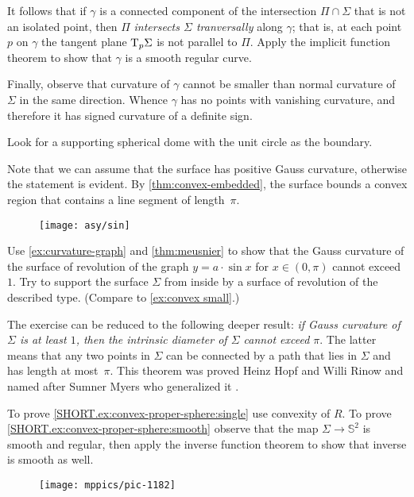 It follows that if $\gamma$ is a connected component of the intersection $\Pi\cap\Sigma$ that is not an isolated point,
then $\Pi$ \emph{intersects $\Sigma$ tranversally} along $\gamma$;
that is, at each point $p$ on $\gamma$ the tangent plane $\mathrm{T}_p\Sigma$ is not parallel to $\Pi$.
Apply the implicit function theorem to show that $\gamma$ is a smooth regular curve.

Finally, observe that curvature of $\gamma$ cannot be smaller than normal curvature of $\Sigma$ in the same direction.
Whence $\gamma$ has no points with vanishing curvature, and therefore it has signed curvature of a definite sign.


Look for a supporting spherical dome with the unit circle as the boundary.

Note that we can assume that the surface has positive Gauss curvature, otherwise the statement is evident.
By \ref{thm:convex-embedded}, the surface bounds a convex region that contains a line segment of length~$\pi$.

\begin{figure}[h!]
\vskip-0mm
\centering
\texttt{[image: asy/sin]}
\vskip-0mm
\end{figure}

Use \ref{ex:curvature-graph} and \ref{thm:meusnier} to show that the Gauss curvature of the surface of revolution of the graph $y=a\cdot \sin x$ for $x\in(0,\pi)$ cannot exceed $1$.
Try to support the surface $\Sigma$ from inside by a surface of revolution of the described type.
(Compare to \ref{ex:convex small}.)

The exercise can be reduced to the following deeper result: \emph{if Gauss curvature of $\Sigma$ is at least $1$,
then
the intrinsic diameter of $\Sigma$ cannot exceed $\pi$}.
The latter means that any two points in $\Sigma$ can be connected by a path that lies in $\Sigma$ and has length at most~$\pi$.
This theorem was proved Heinz Hopf and Willi Rinow \cite{hopf-rinow} and 
named after Sumner Myers who generalized it \cite{myers}.

To prove \ref{SHORT.ex:convex-proper-sphere:single} use convexity of $R$.
To prove \ref{SHORT.ex:convex-proper-sphere:smooth} observe that the map $\Sigma\to\mathbb{S}^2$ is smooth and regular, then apply the inverse function theorem to show that inverse is smooth as well.

\begin{wrapfigure}[16]{r}{29 mm}
\vskip-6mm
\centering
\texttt{[image: mppics/pic-1182]}
\vskip-0mm
\end{wrapfigure}

